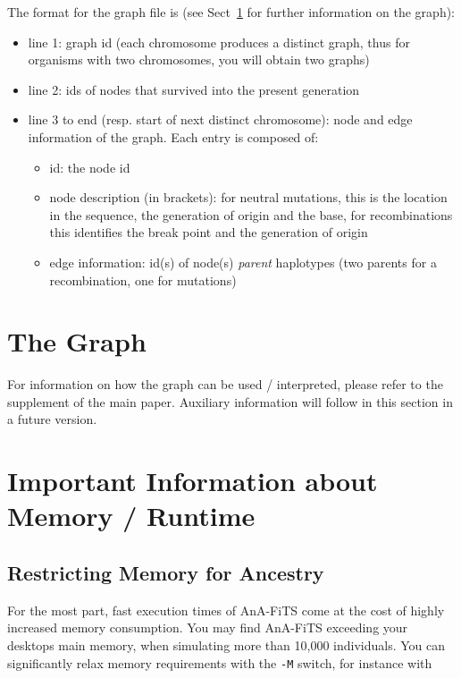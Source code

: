 \documentclass{scrartcl}
\newcommand{\console}[1]{\newline {\footnotesize \texttt{\$ #1}} \newline}
\newcommand{\prog}[1]{\texttt{#1}}
\begin{document}
The format for the graph file is (see Sect~\ref{sec:graph} for further
information on the graph): 
\begin{itemize}
\item line 1: graph id (each chromosome produces a distinct graph,
  thus for organisms with two chromosomes, you will obtain two graphs)
\item line 2: ids of nodes that survived into the present generation
\item line 3 to end (resp. start of next distinct chromosome): node
  and edge information of the graph. Each entry is composed of: 
  \begin{itemize}
  \item id: the node id
  \item node description (in brackets): for neutral mutations, this is
    the location in the sequence, the generation of origin and the
    base, for recombinations this identifies the break point and the
    generation of origin
  \item edge information: id(s) of node(s) \textit{parent} haplotypes
    (two parents for a recombination, one for mutations)
  \end{itemize}   
\end{itemize}

\section{The Graph}
\label{sec:graph}

For information on how the graph can be used / interpreted, please
refer to the supplement of the main paper. Auxiliary information will
follow in this section in a future version.


\section{Important Information about Memory  / Runtime }
\label{sec:some-notes-runtime}

\subsection{Restricting Memory for Ancestry  }
\label{sec:restr-memory-ancestr}
For the most part, fast execution times of AnA-FiTS come at the cost
of highly increased memory consumption. You may find AnA-FiTS
exceeding your desktops main memory, when simulating more than 10,000
individuals. You can significantly relax memory requirements with the
\prog{-M} switch, for instance with \console{
  ./Anafits -n myRun -s 3 -M 2G }
\end{document}
